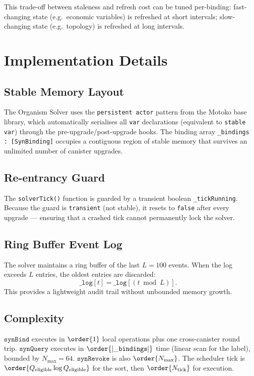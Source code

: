 \documentclass[12pt]{article}
\newcommand{\synBind}{\texttt{synBind}}
\newcommand{\synQuery}{\texttt{synQuery}}
\newcommand{\synRevoke}{\texttt{synRevoke}}
\begin{document}
This trade-off between staleness and refresh cost can be tuned per-binding:
fast-changing state (e.g.\ economic variables) is refreshed at short intervals;
slow-changing state (e.g.\ topology) is refreshed at long intervals.

\section{Implementation Details}
\label{sec:impl}

\subsection{Stable Memory Layout}

The Organism Solver uses the \texttt{persistent actor} pattern from the Motoko
base library, which automatically serialises all \texttt{var} declarations
(equivalent to \texttt{stable var}) through the pre-upgrade/post-upgrade hooks.
The binding array \texttt{\_bindings : [SynBinding]} occupies a contiguous
region of stable memory that survives an unlimited number of canister upgrades.

\subsection{Re-entrancy Guard}

The \texttt{solverTick()} function is guarded by a transient boolean
\texttt{\_tickRunning}.  Because the guard is \texttt{transient} (not stable),
it resets to \texttt{false} after every upgrade — ensuring that a crashed tick
cannot permanently lock the solver.

\subsection{Ring Buffer Event Log}

The solver maintains a ring buffer of the last $L = 100$ events.  When the
log exceeds $L$ entries, the oldest entries are discarded:
\[
  \mathtt{\_log}[t] = \mathtt{\_log}[(t \bmod L)].
\]
This provides a lightweight audit trail without unbounded memory growth.

\subsection{Complexity}

$\synBind$ executes in $\order{1}$ local operations plus one cross-canister
round trip.  $\synQuery$ executes in $\order{|\mathtt{\_bindings}|}$ time
(linear scan for the label), bounded by $N_\text{max} = 64$.
$\synRevoke$ is also $\order{N_\text{max}}$.  The scheduler tick is
$\order{Q_\text{eligible} \log Q_\text{eligible}}$ for the sort, then $\order{N_\text{tick}}$
for execution.
\end{document}
